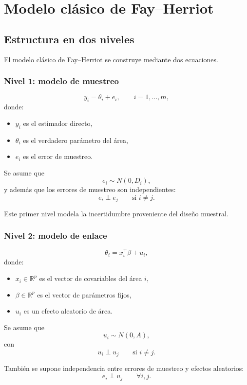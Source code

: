 \section{Modelo clásico de Fay--Herriot}

\subsection{Estructura en dos niveles}

El modelo clásico de Fay--Herriot se construye mediante dos ecuaciones.

\subsubsection{Nivel 1: modelo de muestreo}

\[
y_i = \theta_i + e_i,
\qquad i=1,\dots,m,
\]
donde:
\begin{itemize}
    \item $y_i$ es el estimador directo,
    \item $\theta_i$ es el verdadero parámetro del área,
    \item $e_i$ es el error de muestreo.
\end{itemize}

Se asume que
\[
e_i \sim N(0,D_i),
\]
y además que los errores de muestreo son independientes:
\[
e_i \perp e_j \qquad \text{si } i \neq j.
\]

Este primer nivel modela la incertidumbre proveniente del diseño muestral.

\subsubsection{Nivel 2: modelo de enlace}

\[
\theta_i = x_i^{\top}\beta + u_i,
\]
donde:
\begin{itemize}
    \item $x_i \in \mathbb{R}^{p}$ es el vector de covariables del área $i$,
    \item $\beta \in \mathbb{R}^{p}$ es el vector de parámetros fijos,
    \item $u_i$ es un efecto aleatorio de área.
\end{itemize}

Se asume que
\[
u_i \sim N(0,A),
\]
con
\[
u_i \perp u_j \qquad \text{si } i \neq j.
\]

También se supone independencia entre errores de muestreo y efectos aleatorios:
\[
e_i \perp u_j \qquad \forall i,j.
\]

